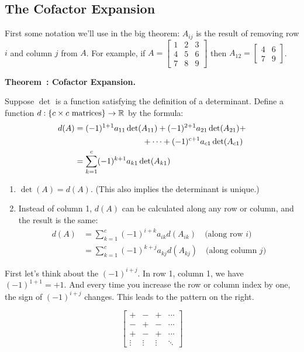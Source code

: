 \documentclass[11pt, letterpaper]{report}
\let\originalleft\left
\let\originalright\right
\renewcommand{\left}{\mathopen{}\mathclose\bgroup\originalleft}
\renewcommand{\right}{\aftergroup\egroup\originalright}
\newcounter{example}[section]
\newcounter{theorem}[chapter]
\newenvironment{theorem}[1][]{\refstepcounter{theorem}\begin{bbox}\par
    \noindent\textbf{Theorem~\thetheorem: #1}}{\end{bbox}}
\newcommand{\bbtwocol}[4]{%
  \begin{minipage}[t]{#1\linewidth} \vspace{0em} #3 \end{minipage}
  \hfill
  \begin{minipage}[t]{#2\linewidth} \vspace{0em} #4 \end{minipage}
}
\newlength\oldfboxsep%
\newlength\myminiwidth%
\newenvironment{bbox}{%
  \setlength\oldfboxsep\fboxsep
  \setlength{\fboxsep}{.1in}%
  \setlength\myminiwidth\linewidth%
  \addtolength\myminiwidth{-0.2in}%
  \vspace{0.1in}%
  \begin{lrbox}{\bboxbox}\begin{minipage}{\myminiwidth}%
    }{%
    \end{minipage}\end{lrbox}%
  \noindent\fbox{\usebox{\bboxbox}}\vspace{0.1in}\setlength\fboxsep\oldfboxsep%
}
\newcommand{\R}{\mathbb{R}}
\begin{document}
\subsection{The Cofactor Expansion}\label{subsec:the-cofactor-expansion}

First some notation we'll use in the big theorem:
$A_{ij}$ is the result of removing row $i$ and column $j$ from $A$. For example, if $A = \begin{bmatrix}
  1 & 2 & 3 \\
  4 & 5 & 6 \\
  7 & 8 & 9
\end{bmatrix}$ then $A_{12} = \begin{bmatrix}
  4 & 6 \\
  7 & 9
\end{bmatrix}$. 

\begin{theorem}[Cofactor Expansion.] \label{theorem:cofactor-expansion}  

Suppose $\det$ is a function satisfying the definition of a determinant. Define a function $d: \left\{c \times c\text{ matrices}\right\} \rightarrow \R$ by the formula:
\begin{align*}
 d(A) &= (-1)^{1+1}a_{11}\det(A_{11}) + (-1)^{2+1}a_{21}\det(A_{21}) + \\
& \hspace{8.3em} + \cdots + (-1)^{c+1}a_{c1}\det(A_{c1}) \\
&= \sum_{k=1}^c(-1)^{k+1}a_{k1}\det(A_{k1})
\end{align*}
\begin{enumerate}[label=(\roman*)]
\item $\det(A) = d(A)$. (This also implies the determinant is unique.)
\item Instead of column 1, $d(A)$ can be calculated along any row or column, and the result is the same:
\begin{align*}
d(A) &= \sum_{k=1}^c(-1)^{i+k}a_{ik}d(A_{ik}) \quad \text{(along row } i)\\
    &=  \sum_{k=1}^c(-1)^{k+j}a_{kj}d(A_{kj}) \quad \text{(along column }j)
\end{align*}
\end{enumerate}
\end{theorem}

\bbtwocol{0.65}{0.35}{
First let's think about the $(-1)^{i+j}$. In row 1, column 1, we have $(-1)^{1+1} = +1$. And every time you increase the row or column index by one, the sign of $(-1)^{i+j}$ changes. This leads to the pattern on the right.
}{
\[\begin{bmatrix}
+ & - & + & \cdots \\
- & + & - & \cdots \\
+ & - & + & \cdots \\
\vdots & \vdots & \vdots & \ddots
\end{bmatrix}\]
}
\end{document}
